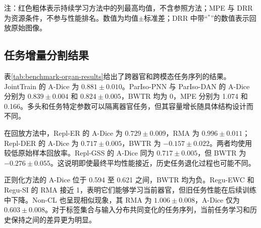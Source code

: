 \begin{table}[htbp]
\vspace{2pt}
\begin{minipage}{0.98\textwidth}
\footnotesize 注：红色粗体表示持续学习方法中的列最高均值，不含参照方法；MPE 与 DRR 为资源条件，不参与性能排名。数值为均值$\pm$标准差；DRR 中带“$^{*}$”的数值表示回放原始图像。
\end{minipage}
\end{table}

\subsection{任务增量分割结果}

表\ref{tab:benchmark-organ-results}给出了跨器官和跨模态任务序列的结果。JointTrain 的 A-Dice 为 $0.881\pm0.010$。ParIso-PNN 与 ParIso-DAN 的 A-Dice 分别为 $0.839\pm0.004$ 和 $0.824\pm0.005$，BWTR 均为 0，MPE 分别为 1.074 和 0.166。多头和任务特定参数可以隔离器官任务，但其容量增长随具体结构设计而不同。

在回放方法中，Repl-ER 的 A-Dice 为 $0.729\pm0.009$，RMA 为 $0.996\pm0.011$；Repl-DER 的 A-Dice 为 $0.717\pm0.005$，BWTR 为 $-0.157\pm0.022$。两者均使用较低原始样本回放率。Repl-GSS 的 A-Dice 同为 $0.717\pm0.005$，但 BWTR 为 $-0.276\pm0.055$。这说明即使最终平均性能接近，历史任务退化过程也可能不同。

正则化方法的 A-Dice 位于 0.594 至 0.621 之间，BWTR 均为负。Regu-EWC 和 Regu-SI 的 RMA 接近 1，表明它们能够学习当前器官，但旧任务性能在后续训练中下降。Non-CL 也呈现相似现象，其 RMA 为 $1.006\pm0.008$，A-Dice 仅为 $0.603\pm0.008$。对于标签集合与输入分布共同变化的任务序列，当前任务学习和历史保持之间的差异更为明显。

